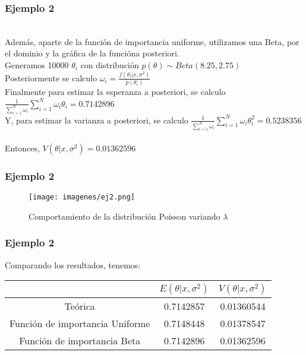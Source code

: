 \documentclass[12pt]{beamer}
\begin{document}
\begin{frame}
\frametitle{Ejemplo 2}
~\\Además, aparte de la función de importancia uniforme, utilizamos una Beta, por el dominio y la gráfica de la funcióna  posteriori.
~\\Generamos 10000 $\theta_{i}$ con distribución $p(\theta)\sim Beta(8.25,2.75)$
~\\Posteriormente se calculo $\omega_{i}=\frac{f(\theta_{i}|x,\sigma^2)}{p(\theta_{i})}$
~\\Finalmente para estimar la esperanza a posteriori, se calculo $\frac{1}{\sum\limits_{i=1}^{N}\omega_{i}}\sum\limits_{i=1}^{N}\omega_{i}\theta_{i}=0.7142896$
~\\Y, para estimar la varianza a posteriori, se calculo $\frac{1}{\sum\limits_{i=1}^{N}\omega_{i}}\sum\limits_{i=1}^{N}\omega_{i}\theta_{i}^2=0.5238356$
~\\Entonces, $V(\theta|x,\sigma^2)=0.01362596$
\end{frame}

\begin{frame}
\frametitle{Ejemplo 2}
\begin{figure}[!h]
    \begin{center}
        \texttt{[image: imagenes/ej2.png]}
        \caption{Comportamiento de la distribución Poisson variando $\lambda$}
        \label{fig:Densidad}
    \end{center}
\end{figure}
\end{frame}

\begin{frame}
\frametitle{Ejemplo 2}
Comparando los resultados, tenemos:
\begin{center}
\begin{tabular}{|c|c|c|}
\hline 
 & $E(\theta|x,\sigma^2)$ & $V(\theta|x,\sigma^2)$ \\ 
\hline 
Teórica & 0.7142857 & 0.01360544 \\ 
Función de importancia Uniforme &  0.7148448 & 0.01378547 \\ 
Función de importancia Beta & 0.7142896 & 0.01362596 \\
\hline 
\end{tabular} 
\end{center}
\end{frame}
\end{document}

